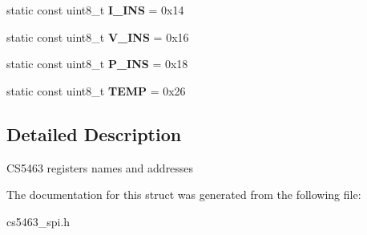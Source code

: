 \begin{DoxyCompactItemize}
\item 
\hypertarget{structcs5463RegAddPg0_a05a6756eb7ffcc1b60a10298d6324173}{static const uint8\-\_\-t {\bfseries I\-\_\-\-I\-N\-S} = 0x14}\label{structcs5463RegAddPg0_a05a6756eb7ffcc1b60a10298d6324173}

\item 
\hypertarget{structcs5463RegAddPg0_a8e8dc5c81c1444c19d8e329b229ef0c2}{static const uint8\-\_\-t {\bfseries V\-\_\-\-I\-N\-S} = 0x16}\label{structcs5463RegAddPg0_a8e8dc5c81c1444c19d8e329b229ef0c2}

\item 
\hypertarget{structcs5463RegAddPg0_acb3b7ac3e530c1027e7d1c5419dfbd77}{static const uint8\-\_\-t {\bfseries P\-\_\-\-I\-N\-S} = 0x18}\label{structcs5463RegAddPg0_acb3b7ac3e530c1027e7d1c5419dfbd77}

\item 
\hypertarget{structcs5463RegAddPg0_a2fa0ea735e8fc4b05c2f474e4f55b921}{static const uint8\-\_\-t {\bfseries T\-E\-M\-P} = 0x26}\label{structcs5463RegAddPg0_a2fa0ea735e8fc4b05c2f474e4f55b921}

\end{DoxyCompactItemize}


\subsection{Detailed Description}
C\-S5463 registers names and addresses 

The documentation for this struct was generated from the following file\-:\begin{DoxyCompactItemize}
\item 
cs5463\-\_\-spi.\-h\end{DoxyCompactItemize}
